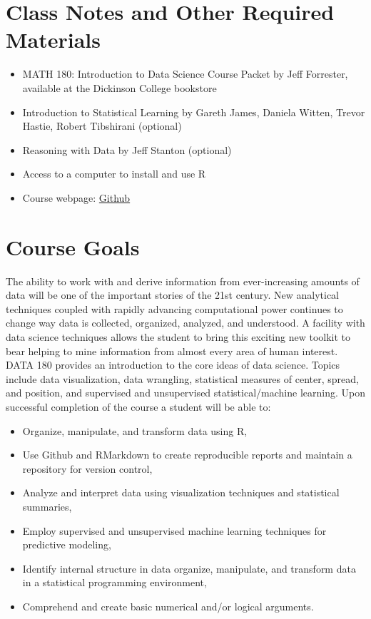 \documentclass[11pt,letter]{article}
\begin{document}
\section*{Class Notes and Other Required Materials}
\begin{itemize}[nosep]
	\item MATH 180: Introduction to Data Science Course Packet by Jeff Forrester, available at the Dickinson College bookstore
  \item Introduction to Statistical Learning by Gareth James, Daniela Witten, Trevor Hastie, Robert Tibshirani (optional)
	\item Reasoning with Data by Jeff Stanton (optional)
	\item Access to a computer to install and use R
	\item Course webpage: \href{https://lms.dickinson.edu}{\url{Github}}
\end{itemize}




\section*{Course Goals}
The ability to work with and derive information from ever-increasing amounts of data will be one of the important stories of the 21st century. New analytical techniques coupled with rapidly advancing computational power continues to change way data is collected, organized, analyzed, and understood. A facility with data science techniques allows the student to bring this exciting new toolkit to bear helping to mine information from almost every area of human interest. DATA 180 provides an introduction to the core ideas of data science. Topics include data visualization, data wrangling, statistical measures of center, spread, and position, and supervised and unsupervised statistical/machine learning. Upon successful completion of the course a student will be able to:
\begin{itemize}[nosep] 
	\item Organize, manipulate, and transform data using R,
	\item Use Github and RMarkdown to create reproducible reports and maintain a repository for version control,
	\item Analyze and interpret data using visualization techniques and statistical summaries,
	\item Employ supervised and unsupervised machine learning techniques for predictive modeling,
	\item Identify internal structure in data organize, manipulate, and transform data in a statistical programming environment, 
	\item Comprehend and create basic numerical and/or logical arguments.
\end{itemize}
\end{document}
